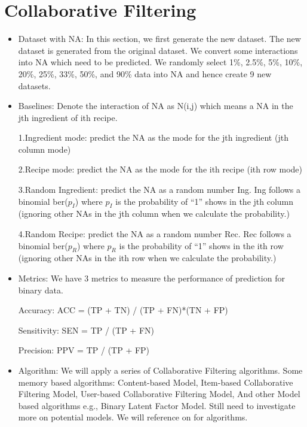 \documentclass{article}
\begin{document}
\section{Collaborative Filtering}
\begin{itemize}
\item Dataset with NA: In this section, we first generate the new dataset. The new dataset is generated from the original dataset. We convert some interactions into NA which need to be predicted. We randomly select 1\%, 2.5\%, 5\%, 10\%, 20\%, 25\%, 33\%, 50\%, and 90\% data into NA and hence create 9 new datasets.
\item Baselines:
Denote the interaction of NA as N(i,j) which means a NA in the jth ingredient of ith recipe.

1.Ingredient mode: predict the NA as the mode for the jth ingredient (jth column mode)

2.Recipe mode: predict the NA as the mode for the ith recipe (ith row mode)

3.Random Ingredient: 
predict the NA as a random number Ing. 
Ing follows a binomial ber($p_I$) where $p_I$ is the probability of “1” shows in the jth column (ignoring other NAs in the jth column when we calculate the probability.)

4.Random Recipe:
predict the NA as a random number Rec. 
Rec follows a binomial ber($p_R$) where $p_R$ is the probability of “1” shows in the ith row (ignoring other NAs in the ith row when we calculate the probability.)

\item Metrics: We have 3 metrics to measure the performance of prediction for binary data.\cite{metrics}

Accuracy: ACC = (TP + TN) / (TP + FN)*(TN + FP)

Sensitivity: SEN = TP / (TP + FN)

Precision: PPV = TP / (TP + FP)

\item Algorithm: We will apply a series of Collaborative Filtering algorithms. Some memory based algorithms: Content-based Model, Item-based Collaborative Filtering Model, User-based Collaborative Filtering Model, And other Model based algorithms e.g., Binary Latent Factor Model. Still need to investigate more on potential models. We will reference on \cite{cf_method1} \cite{cf_method2} for algorithms.

\end{itemize}

\newpage
\printbibliography
\end{document}
